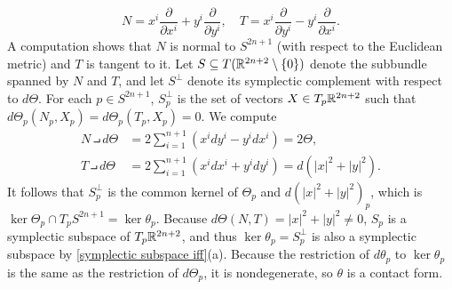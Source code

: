 \begin{example}
\begin{enumerate}
\[N=x^i\frac{\partial}{\partial x^i}+y^i\frac{\partial}{\partial y^i},\quad T=x^i\frac{\partial}{\partial y^i}-y^i\frac{\partial}{\partial x^i}.\]
A computation shows that $N$ is normal to $S^{2n+1}$ (with respect to the Euclidean metric) and $T$ is tangent to it. Let $S\subseteq T(\mathbb{R}^{2n+2}\setminus\{0\})$ denote the subbundle spanned by $N$ and $T$, and let $S^\bot$ denote its symplectic complement with respect to $d\varTheta$. For each $p\in S^{2n+1}$, $S^\bot_p$ is the set of vectors $X\in T_p\mathbb{R}^{2n+2}$ such that $d\varTheta_p(N_p,X_p)=d\varTheta_p(T_p,X_p)=0$. We compute
\begin{align*}
N\intprod d\varTheta&=2\sum_{i=1}^{n+1}(x^idy^i-y^idx^i)=2\varTheta,\\
T\intprod d\varTheta&=2\sum_{i=1}^{n+1}(x^idx^i+y^idy^i)=d(|x|^2+|y|^2).
\end{align*}
It follows that $S^\bot_p$ is the common kernel of $\varTheta_p$ and $d(|x|^2+|y|^2)_p$, which is $\ker\varTheta_p\cap T_pS^{2n+1}=\ker\theta_p$. Because $d\varTheta(N,T)=|x|^2+|y|^2\neq 0$, $S_p$ is a symplectic subspace of $T_p\mathbb{R}^{2n+2}$, and thus $\ker\theta_p=S^\bot_p$ is also a symplectic subspace by \cref{symplectic subspace iff}(a). Because the restriction of $d\theta_p$ to $\ker\theta_p$ is the same as the restriction of $d\varTheta_p$, it is nondegenerate, so $\theta$ is a contact form.
\end{enumerate}
\end{example}

